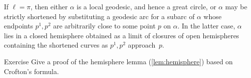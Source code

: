If $\ell=\pi$, then either $\alpha$ is a local geodesic, and hence a great circle, 
or $\alpha$ may be strictly shortened by substituting a geodesic arc for a subarc of $\alpha$ 
whose endpoints $p^1,p^2$ are arbitrarily close to some point $p$ on  $\alpha$.
In the latter case,  $\alpha$ lies in a closed hemisphere obtained as a limit of closures of open hemispheres  containing the shortened curves as $p^1,p^2$ approach~$p$.
\qeds




\begin{thm}{Exercise}\label{exr-crofton}
Give a proof of the hemisphere lemma (\ref{lem:hemisphere}) based on Crofton's formula.
\end{thm}








